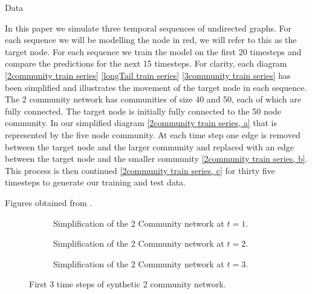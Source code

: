 \documentclass[12pt]{amsart}
\begin{document}
\begin{section}{Data}

    In this paper we simulate three temporal sequences of undirected graphs. For each sequence we will be modelling the node in red, we will refer to this as the target node. For each sequence we train the model on the first 20 timesteps and compare the predictions for the next 15 timesteps. For clarity, each diagram \autoref{2community train series} \autoref{longTail train series} \autoref{3community train series} has been simplified and illustrates the movement of the target node in each sequence.\\
    
    The 2 community network has communities of size 40 and 50, each of which are fully connected. The target node is initially fully connected to the 50 node community. In our simplified diagram \autoref{2community train series, a} that is represented by the five node community. At each time step one edge is removed between the target node and the larger community and replaced with an edge between the target node and the smaller community \autoref{2community train series, b}. This process is then continued \autoref{2community train series, c} for thirty five timesteps to generate our training and test data.

    Figures obtained from \cite{Emma2023}.
    \begin{figure}[H]
        \centering
        \centering
        \begin{subfigure}[c]{0.3\textwidth}
            \centering
            \resizebox{.6\width}{!}{}
            \caption{Simplification of the 2 Community network at $t=1$.}
            \label{2community train series, a}
        \end{subfigure}
        \hfill
        \centering
        \begin{subfigure}[c]{0.3\textwidth}
            \centering
            \resizebox{.6\width}{!}{}
            \caption{Simplification of the 2 Community network at $t=2$.}
            \label{2community train series, b}
        \end{subfigure}
        \hfill
        \centering
        \begin{subfigure}[c]{0.3\textwidth}
            \centering
            \resizebox{.6\width}{!}{}
            \caption{Simplification of the 2 Community network at $t=3$.}
            \label{2community train series, c}
        \end{subfigure}
        \caption{First 3 time steps of synthetic 2 community network.}
        \label{2community train series}
    \end{figure}


\end{section}
\end{document}
